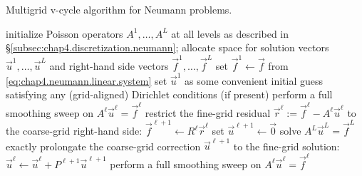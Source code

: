 \begin{algorithm}[htbp]
\caption{Multigrid v-cycle algorithm for Neumann problems.}
\label{alg:chap4.multigrid.neumann.vcycle}
\begin{algorithmic}[1]
\STATE initialize Poisson operators $A^1, \dotsc, A^L$ at all levels as described in \S\ref{subsec:chap4.discretization.neumann}; allocate space for solution vectors $\vec{u}^1, \dotsc, \vec{u}^L$ and right-hand side vectors $\vec{f}^1, \dotsc, \vec{f}^L$
\STATE set $\vec{f}^1 \leftarrow \vec{f}$ from \eqref{eq:chap4.neumann.linear.system}
\STATE set $\vec{u}^1$ as some convenient initial guess satisfying any (grid-aligned) Dirichlet conditions (if present)
    \STATE perform a full smoothing sweep on $A^{\ell} \vec{u}^{\ell} = \vec{f}^{\ell}$ 
    \STATE restrict the fine-grid residual $\vec{r}^{\ell} := \vec{f}^{\ell} - A^{\ell} \vec{u}^{\ell}$ to the coarse-grid right-hand side: $\vec{f}^{\ell+1} \leftarrow R^{\ell} \vec{r}^{\ell}$ 
    \STATE set $\vec{u}^{\ell+1} \leftarrow \vec{0}$
\ENDFOR
\STATE solve $A^L \vec{u}^L = \vec{f}^L$ exactly 
    \STATE prolongate the coarse-grid correction $\vec{u}^{\ell+1}$ to the fine-grid solution: $\vec{u}^{\ell} \leftarrow \vec{u}^{\ell} + P^{\ell+1} \vec{u}^{\ell+1}$ 
    \STATE perform a full smoothing sweep on $A^{\ell} \vec{u}^{\ell} = \vec{f}^{\ell}$ 
\ENDFOR
\end{algorithmic}
\end{algorithm}

